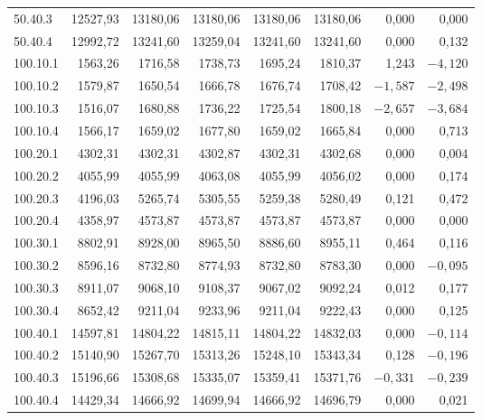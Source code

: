 \documentclass[../DoAn.tex]{subfiles}
\begin{document}
\begin{small}
\begin{longtable}{l|r|rr|rr|rr}
50.40.3 & 12527,93 & 13180,06 & 13180,06 & 13180,06 & 13180,06 & 0,000 & 0,000 \\
50.40.4 & 12992,72 & 13241,60 & 13259,04 & 13241,60 & 13241,60 & 0,000 & 0,132 \\
100.10.1 & 1563,26 & 1716,58 & 1738,73 & 1695,24 & 1810,37 & 1,243 & $-4{,}120$ \\
100.10.2 & 1579,87 & 1650,54 & 1666,78 & 1676,74 & 1708,42 & $-1{,}587$ & $-2{,}498$ \\
100.10.3 & 1516,07 & 1680,88 & 1736,22 & 1725,54 & 1800,18 & $-2{,}657$ & $-3{,}684$ \\
100.10.4 & 1566,17 & 1659,02 & 1677,80 & 1659,02 & 1665,84 & 0,000 & 0,713 \\
100.20.1 & 4302,31 & 4302,31 & 4302,87 & 4302,31 & 4302,68 & 0,000 & 0,004 \\
100.20.2 & 4055,99 & 4055,99 & 4063,08 & 4055,99 & 4056,02 & 0,000 & 0,174 \\
100.20.3 & 4196,03 & 5265,74 & 5305,55 & 5259,38 & 5280,49 & 0,121 & 0,472 \\
100.20.4 & 4358,97 & 4573,87 & 4573,87 & 4573,87 & 4573,87 & 0,000 & 0,000 \\
100.30.1 & 8802,91 & 8928,00 & 8965,50 & 8886,60 & 8955,11 & 0,464 & 0,116 \\
100.30.2 & 8596,16 & 8732,80 & 8774,93 & 8732,80 & 8783,30 & 0,000 & $-0{,}095$ \\
100.30.3 & 8911,07 & 9068,10 & 9108,37 & 9067,02 & 9092,24 & 0,012 & 0,177 \\
100.30.4 & 8652,42 & 9211,04 & 9233,96 & 9211,04 & 9222,43 & 0,000 & 0,125 \\
100.40.1 & 14597,81 & 14804,22 & 14815,11 & 14804,22 & 14832,03 & 0,000 & $-0{,}114$ \\
100.40.2 & 15140,90 & 15267,70 & 15313,26 & 15248,10 & 15343,34 & 0,128 & $-0{,}196$ \\
100.40.3 & 15196,66 & 15308,68 & 15335,07 & 15359,41 & 15371,76 & $-0{,}331$ & $-0{,}239$ \\
100.40.4 & 14429,34 & 14666,92 & 14699,94 & 14666,92 & 14696,79 & 0,000 & 0,021 \\
\end{longtable}
\end{small}
\end{document}
